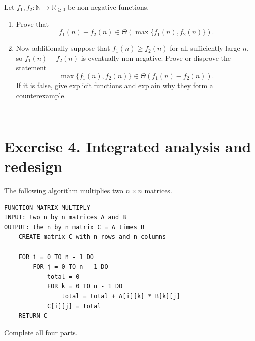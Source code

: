 \documentclass[11pt,a4paper]{article}
\makeatletter
\newcommand{\Needspace}[1]{\par\penalty-100\begingroup\setlength{\dimen@}{#1}\dimen@ii\pagegoal\advance\dimen@ii-\pagetotal\ifdim\dimen@>\dimen@ii\break\fi\endgroup}
\makeatother
\begin{document}
\begin{problembox}
Let $f_1,f_2:\mathbb{N}\rightarrow\mathbb{R}_{\ge0}$ be non-negative
functions.

\begin{enumerate}[label=(\alph*)]
    \item Prove that
    \[
        f_1(n)+f_2(n)
        \in\Theta\!\left(\max\{f_1(n),f_2(n)\}\right).
    \]
    \item Now additionally suppose that $f_1(n)\ge f_2(n)$ for all sufficiently
    large $n$, so $f_1(n)-f_2(n)$ is eventually non-negative. Prove or disprove
    the statement
    \[
        \max\{f_1(n),f_2(n)\}
        \in\Theta\!\left(f_1(n)-f_2(n)\right).
    \]
    If it is false, give explicit functions and explain why they form a
    counterexample.
\end{enumerate}
\end{problembox}

\Needspace{0.60\textheight}
\section{Exercise 4. Integrated analysis and redesign}

\begin{problembox}
The following algorithm multiplies two $n\times n$ matrices.

\begin{lstlisting}[style=pseudo]
FUNCTION MATRIX_MULTIPLY
INPUT: two n by n matrices A and B
OUTPUT: the n by n matrix C = A times B
    CREATE matrix C with n rows and n columns

    FOR i = 0 TO n - 1 DO
        FOR j = 0 TO n - 1 DO
            total = 0
            FOR k = 0 TO n - 1 DO
                total = total + A[i][k] * B[k][j]
            C[i][j] = total
    RETURN C
\end{lstlisting}
\end{problembox}

Complete all four parts.
\end{document}
